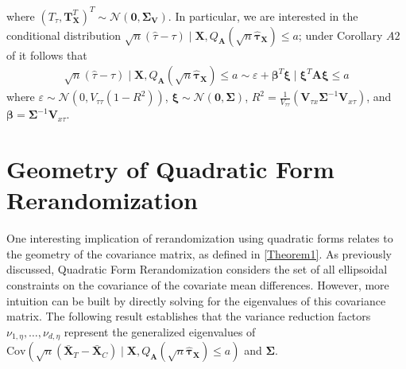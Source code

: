 \documentclass[11pt,twoside]{article}
\theoremstyle{definition}
\theoremstyle{remark}
\begin{document}
where $(T_\tau, \mathbf{T}^T_{\mathbf{X}})^T \sim \mathcal{N}(\mathbf{0}, \mathbf{\Sigma}_{\mathbf{V}})$. In particular, we are interested in the conditional distribution $\sqrt{n}(\widehat{\tau} - \tau) \mid \mathbf{X}, Q_{\mathbf{A}}(\sqrt{n} \widehat{\bm{\tau}}_{\mathbf{X}}) \leq a$; under Corollary $A2$ of \cite{li2018asymptotic} it follows that
\begin{align} \label{tau_dist}
    \sqrt{n}(\widehat{\tau} - \tau) \mid \mathbf{X}, Q_{\mathbf{A}}(\sqrt{n} \widehat{\bm{\tau}}_{\mathbf{X}}) \leq a \sim \varepsilon + \bm{\beta}^T \bm{\xi} \mid  \bm{\xi}^T \mathbf{A} \bm{\xi} \leq a
\end{align}
where $\varepsilon \sim \mathcal{N}(0, V_{\tau \tau}(1 - R^2))$, $\bm{\xi} \sim \mathcal{N}(\mathbf{0}, \mathbf{\Sigma})$, $R^2 = \frac{1}{V_{\tau \tau }} (\mathbf{V}_{\tau x} \mathbf{\Sigma}^{-1} \mathbf{V}_{x \tau})$, and $\bm{\beta} = \mathbf{\Sigma}^{-1} \mathbf{V}_{x \tau}$. 

\section{Geometry of Quadratic Form Rerandomization} \label{geometry_section}

One interesting implication of rerandomization using quadratic forms relates to the geometry of the covariance matrix, as defined in \cref{Theorem1}. As previously discussed, Quadratic Form Rerandomization considers the set of all ellipsoidal constraints on the covariance of the covariate mean differences. However, more intuition can be built by directly solving for the eigenvalues of this covariance matrix. The following result establishes that the variance reduction factors $\nu_{1, \eta}, \ldots, \nu_{d, \eta}$ represent the generalized eigenvalues of $\text{Cov}\left(\sqrt{n}\left(\bar{\mathbf{X}}_T - \bar{\mathbf{X}}_C\right) \mid \mathbf{X},  Q_\mathbf{A}(\sqrt{n} \widehat{\bm{\tau}}_{\mathbf{X}}) \leq a\right)$ and $\mathbf{\Sigma}$.
\end{document}
